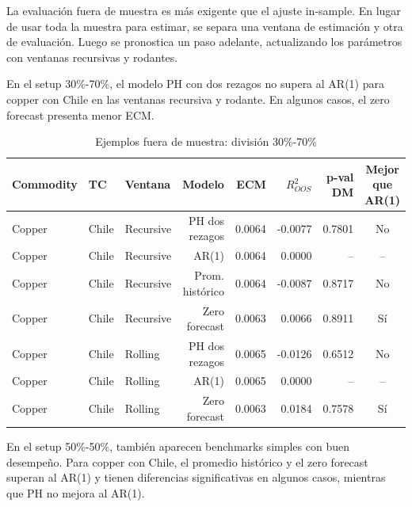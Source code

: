 \documentclass[11pt,letterpaper]{article}
\begin{document}
La evaluación fuera de muestra es más exigente que el ajuste in-sample. En lugar de usar toda la muestra para estimar, se separa una ventana de estimación y otra de evaluación. Luego se pronostica un paso adelante, actualizando los parámetros con ventanas recursivas y rodantes.

En el setup 30\%-70\%, el modelo PH con dos rezagos no supera al AR(1) para copper con Chile en las ventanas recursiva y rodante. En algunos casos, el zero forecast presenta menor ECM.

\begin{table}[H]
\centering
\caption{Ejemplos fuera de muestra: división 30\%-70\%}
\scriptsize
\begin{tabular}{lllrrrrc}
\toprule
Commodity & TC & Ventana & Modelo & ECM & $R^2_{OOS}$ & p-val DM & Mejor que AR(1) \\
\midrule
Copper & Chile & Recursive & PH dos rezagos & 0.0064 & -0.0077 & 0.7801 & No \\
Copper & Chile & Recursive & AR(1) & 0.0064 & 0.0000 & -- & -- \\
Copper & Chile & Recursive & Prom. histórico & 0.0064 & -0.0087 & 0.8717 & No \\
Copper & Chile & Recursive & Zero forecast & 0.0063 & 0.0066 & 0.8911 & Sí \\
Copper & Chile & Rolling & PH dos rezagos & 0.0065 & -0.0126 & 0.6512 & No \\
Copper & Chile & Rolling & AR(1) & 0.0065 & 0.0000 & -- & -- \\
Copper & Chile & Rolling & Zero forecast & 0.0063 & 0.0184 & 0.7578 & Sí \\
\bottomrule
\end{tabular}
\end{table}

En el setup 50\%-50\%, también aparecen benchmarks simples con buen desempeño. Para copper con Chile, el promedio histórico y el zero forecast superan al AR(1) y tienen diferencias significativas en algunos casos, mientras que PH no mejora al AR(1).
\end{document}
